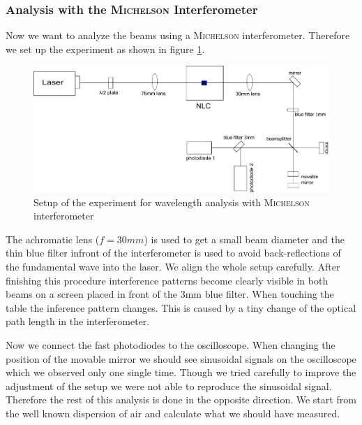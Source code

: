 \documentclass{protokoll_en}
\begin{document}
\subsubsection{Analysis with the \textsc{Michelson} Interferometer}
\label{subsubsec:ana_michelson}
Now we want to analyze the beams using a \textsc{Michelson} interferometer. Therefore we set up the experiment as shown in figure \ref{fig:setup_michelson}.
\begin{figure}[H]
  \centering
  \includegraphics[width=1.0\textwidth]{graphics/setup_michelson}
  \caption{Setup of the experiment for wavelength analysis with \textsc{Michelson} interferometer}
  \label{fig:setup_michelson}
\end{figure}
The achromatic lens ($f=30mm$) is used to get a small beam diameter and the thin blue filter infront of the interferometer is used to avoid back-reflections of the fundamental wave into the laser. We align the whole setup carefully. After finishing this procedure interference patterns become clearly visible in both beams on a screen placed in front of the 3mm blue filter. When touching the table the inference pattern changes. This is caused by a tiny change of the optical path length in the interferometer.

Now we connect the fast photodiodes to the oscilloscope. When changing the position of the movable mirror we should see sinusoidal signals on the oscilloscope which we observed only one single time. Though we tried carefully to improve the adjustment of the setup we were not able to reproduce the sinusoidal signal. Therefore the rest of this analysis is done in the opposite direction. We start from the well known dispersion of air and calculate what we should have measured.
\end{document}
